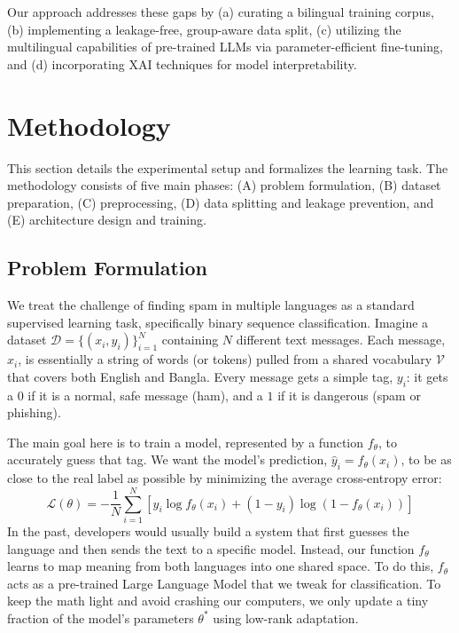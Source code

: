 \documentclass[journal]{IEEEtran}
\begin{document}
Our approach addresses these gaps by (a) curating a bilingual training corpus, (b) implementing a leakage-free, group-aware data split, (c) utilizing the multilingual capabilities of pre-trained LLMs via parameter-efficient fine-tuning, and (d) incorporating XAI techniques for model interpretability.



\section{Methodology}

This section details the experimental setup and formalizes the learning task. The methodology consists of five main phases: (A) problem formulation, (B) dataset preparation, (C) preprocessing, (D) data splitting and leakage prevention, and (E) architecture design and training.

\subsection{Problem Formulation}

We treat the challenge of finding spam in multiple languages as a standard supervised learning task, specifically binary sequence classification. Imagine a dataset $\mathcal{D} = \{(x_i, y_i)\}_{i=1}^{N}$ containing $N$ different text messages. Each message, $x_i$, is essentially a string of words (or tokens) pulled from a shared vocabulary $\mathcal{V}$ that covers both English and Bangla. Every message gets a simple tag, $y_i$: it gets a $0$ if it is a normal, safe message (ham), and a $1$ if it is dangerous (spam or phishing). 

The main goal here is to train a model, represented by a function $f_\theta$, to accurately guess that tag. We want the model's prediction, $\hat{y}_i = f_\theta(x_i)$, to be as close to the real label as possible by minimizing the average cross-entropy error:
\begin{equation}
\mathcal{L}(\theta) = -\frac{1}{N} \sum_{i=1}^{N} \left[ y_i \log f_\theta(x_i) + (1 - y_i) \log (1 - f_\theta(x_i)) \right]
\end{equation}
In the past, developers would usually build a system that first guesses the language and then sends the text to a specific model. Instead, our function $f_\theta$ learns to map meaning from both languages into one shared space. To do this, $f_\theta$ acts as a pre-trained Large Language Model that we tweak for classification. To keep the math light and avoid crashing our computers, we only update a tiny fraction of the model's parameters $\theta^*$ using low-rank adaptation.
\end{document}
